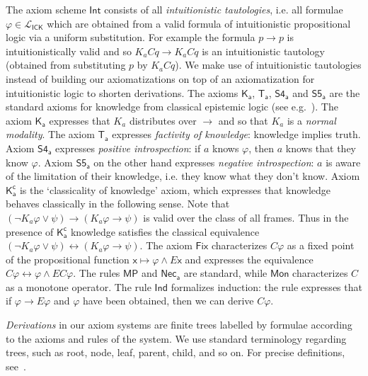 \documentclass{myifcolog}
\newcommand\C {C}
\newcommand{\K}{K}
\newcommand{\agi}{a}
\newcommand{\E}{E}
\newcommand{\ICK}{\mathsf{ICK}}
\newcommand{\LICK}{\mathcal{L}_{\ICK}}
\numberwithin{theorem}{section}
\begin{document}
The axiom scheme $\mathsf{Int}$ consists of all \emph{intuitionistic tautologies}, i.e. all formulae $\varphi \in \LICK$ which are obtained from a valid formula of intuitionistic propositional logic via a uniform substitution. For example the formula $p \rightarrow p$ is intuitionistically valid and so $\K_\agi \C q \rightarrow \K_\agi \C q$ is an intuitionistic tautology (obtained from substituting $p$ by $\K_\agi \C q$). We make use of intuitionistic tautologies instead of building our axiomatizations on top of an axiomatization for intuitionistic logic to shorten derivations. The axioms $\mathsf{K_a}$, $\mathsf{T_a}$, $\mathsf{S4_a}$ and $\mathsf{S5_\agi}$ are the standard axioms for knowledge from classical epistemic logic (see e.g.~\cite{ditmarsch_2017}). The axiom $\mathsf{K_a}$ expresses that $K_\agi$ distributes over $\to$ and so that $K_\agi$ is a \emph{normal modality}. The axiom $\mathsf{T_a}$ expresses \emph{factivity of knowledge}: knowledge implies truth. Axiom $\mathsf{S4_a}$ expresses \emph{positive introspection}: if $\agi$ knows $\varphi$, then $\agi$ knows that they know $\varphi$. Axiom $\mathsf{S5_\agi}$ on the other hand expresses \emph{negative introspection}: $\agi$ is aware of the limitation of their knowledge, i.e. they know what they don't know. Axiom $\mathsf{\K_\agi^c}$ is the `classicality of knowledge' axiom, which expresses that knowledge behaves classically in the following sense. Note that $(\neg \K_\agi \varphi \vee \psi) \rightarrow (\K_\agi \varphi \rightarrow \psi)$ is valid over the class of all frames. Thus in the presence of $\mathsf{\K_\agi^c}$  knowledge satisfies the classical equivalence $(\neg \K_\agi \varphi \vee \psi) \leftrightarrow (\K_\agi \varphi \rightarrow \psi)$. The axiom $\mathsf{Fix}$ characterizes $\C \varphi$ as a fixed point of the propositional function $\mathsf{x} \mapsto \varphi \wedge \E \mathsf{x}$ and expresses the equivalence $\C \varphi \leftrightarrow \varphi \wedge \E \C \varphi$. The rules $\mathsf{MP}$ and $\mathsf{Nec_a}$ are standard, while $\mathsf{Mon}$ characterizes $\C$ as a monotone operator. The rule $\mathsf{Ind}$ formalizes induction: the rule expresses that if $\varphi \rightarrow \E \varphi$ and $\varphi$ have been obtained, then we can derive $\C \varphi$.

\emph{Derivations} in our axiom systems are finite trees labelled by formulae according to the axioms and rules of the system. We use standard terminology regarding trees, such as root, node, leaf, parent, child, and so on. For precise definitions, see~\cite[Chapter 2]{Zenger_2025}.
    
\end{document}
